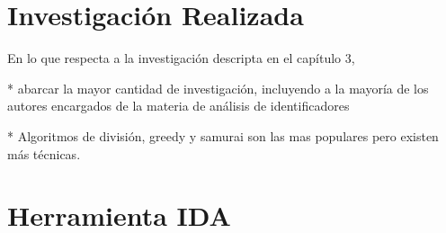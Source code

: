 


\section{Investigación Realizada}

En lo que respecta a la investigación descripta en el capítulo 3, 

* abarcar la mayor cantidad de investigación, incluyendo a la mayoría de los autores encargados de la materia de análisis de identificadores

* Algoritmos de división, greedy y samurai son las mas populares pero existen más técnicas.


\section{Herramienta IDA}

